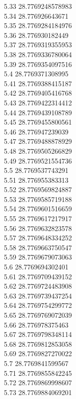 {5.33	28.7769248578983\\
5.34	28.776926643671\\
5.35	28.7769284184976\\
5.36	28.776930182449\\
5.37	28.7769319355953\\
5.38	28.7769336780064\\
5.39	28.7769354097516\\
5.4	28.7769371308995\\
5.41	28.7769388415187\\
5.42	28.7769405416768\\
5.43	28.7769422314412\\
5.44	28.7769439108789\\
5.45	28.7769455800561\\
5.46	28.776947239039\\
5.47	28.7769488878929\\
5.48	28.7769505266829\\
5.49	28.7769521554736\\
5.5	28.7769537743291\\
5.51	28.776955383313\\
5.52	28.7769569824887\\
5.53	28.7769585719188\\
5.54	28.7769601516659\\
5.55	28.7769617217917\\
5.56	28.7769632823578\\
5.57	28.7769648334252\\
5.58	28.7769663750547\\
5.59	28.7769679073063\\
5.6	28.7769694302401\\
5.61	28.7769709439152\\
5.62	28.7769724483908\\
5.63	28.7769739437254\\
5.64	28.7769754299772\\
5.65	28.7769769072039\\
5.66	28.776978375463\\
5.67	28.7769798348114\\
5.68	28.7769812853058\\
5.69	28.7769827270022\\
5.7	28.7769841599567\\
5.71	28.7769855842245\\
5.72	28.7769869998607\\
5.73	28.7769884069201\\
}
